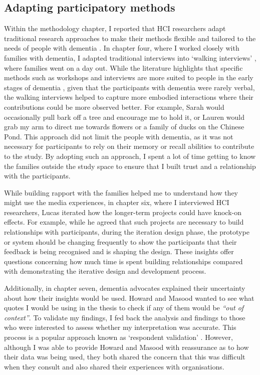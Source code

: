 \subsection{Adapting participatory methods}
\label{AdoptingMethods}
Within the methodology chapter, I reported that HCI researchers adapt traditional research approaches to make their methods flexible and tailored to the needs of people with dementia \citep{webb2020misfitting}. In chapter four, where I worked closely with families with dementia, I adapted traditional interviews into `walking interviews' \citep{kullberg2017walking}, where families went on a day out. While the literature highlights that specific methods such as workshops and interviews are more suited to people in the early stages of dementia \citep{lindsay_empathy_2012}, given that the participants with dementia were rarely verbal, the walking interviews helped to capture more embodied interactions where their contributions could be more observed better. For example, Sarah would occasionally pull bark off a tree and encourage me to hold it, or Lauren would grab my arm to direct me towards flowers or a family of ducks on the Chinese Pond. This approach did not limit the people with dementia, as it was not necessary for participants to rely on their memory or recall abilities to contribute to the study. By adopting such an approach, I spent a lot of time getting to know the families outside the study space to ensure that I built trust and a relationship with the participants. 

While building rapport with the families helped me to understand how they might use the media experiences, in chapter six, where I interviewed HCI researchers, Lucas iterated how the longer-term projects could have knock-on effects. For example, while he agreed that such projects are necessary to build relationships with participants, during the iteration design phase, the prototype or system should be changing frequently to show the participants that their feedback is being recognised and is shaping the design. These insights offer questions concerning how much time is spent building relationships compared with demonstrating the iterative design and development process.

Additionally, in chapter seven, dementia advocates explained their uncertainty about how their insights would be used. Howard and Masood wanted to see what quotes I would be using in the thesis to check if any of them would be \textit{``out of context''}. To validate my findings, I fed back the analysis and findings to those who were interested to assess whether my interpretation was accurate. This process is a popular approach known as `respondent validation' \citep{richards2002ethics}. However, although I was able to provide Howard and Masood with reassurance as to how their data was being used, they both shared the concern that this was difficult when they consult and also shared their experiences with organisations.

